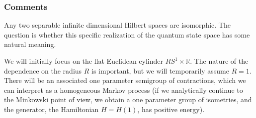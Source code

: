 \documentclass{amsart}
\theoremstyle{conjecture}
\theoremstyle{definition}
\theoremstyle{question}
\theoremstyle{questions}
\theoremstyle{remark}
\theoremstyle{remarks}
\theoremstyle{example}
\numberwithin{equation}{section}
\begin{document}
\subsubsection{Comments}
Any two separable infinite dimensional Hilbert spaces are isomorphic. The question is whether this specific realization of the quantum state space has some natural meaning. 

We will initially focus on the flat Euclidean cylinder $RS^1\times \mathbb R$. The nature of the dependence on the radius $R$ is important, but we will temporarily assume $R=1$. There will be an associated one parameter semigroup of contractions, which we can interpret as a homogeneous Markov process (if we analytically continue to the Minkowski point of view, we obtain a one parameter group of isometries, and the generator, the Hamiltonian $H=H(1)$, has positive energy).
\end{document}
